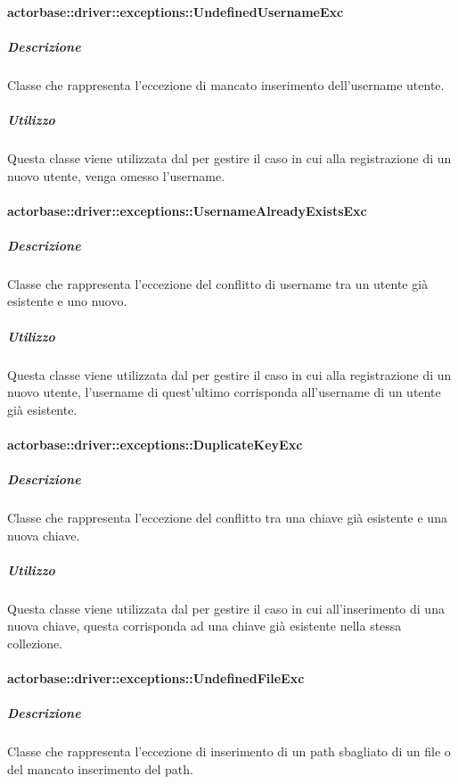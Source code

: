 \documentclass{scalatekids-article}
\begin{document}
\paragraph{actorbase::driver::exceptions::UndefinedUsernameExc}

\subparagraph{Descrizione}

Classe che rappresenta l'eccezione di mancato inserimento dell'username utente.

\subparagraph{Utilizzo}

Questa classe viene utilizzata dal  per gestire il caso in cui alla registrazione di un nuovo utente, venga omesso l'username.

\paragraph{actorbase::driver::exceptions::UsernameAlreadyExistsExc}

\subparagraph{Descrizione}

Classe che rappresenta l'eccezione del conflitto di username tra un utente già esistente e uno nuovo.

\subparagraph{Utilizzo}

Questa classe viene utilizzata dal  per gestire il caso in cui alla registrazione di un nuovo utente, l'username di quest'ultimo corrisponda all'username di un utente già esistente.

\paragraph{actorbase::driver::exceptions::DuplicateKeyExc}

\subparagraph{Descrizione}

Classe che rappresenta l'eccezione del conflitto tra una chiave già esistente e una nuova chiave.

\subparagraph{Utilizzo}

Questa classe viene utilizzata dal  per gestire il caso in cui all'inserimento di una nuova chiave, questa corrisponda ad una chiave già esistente nella stessa collezione.

\paragraph{actorbase::driver::exceptions::UndefinedFileExc}

\subparagraph{Descrizione}

Classe che rappresenta l'eccezione di inserimento di un path sbagliato di un file o del mancato inserimento del path.
\end{document}
